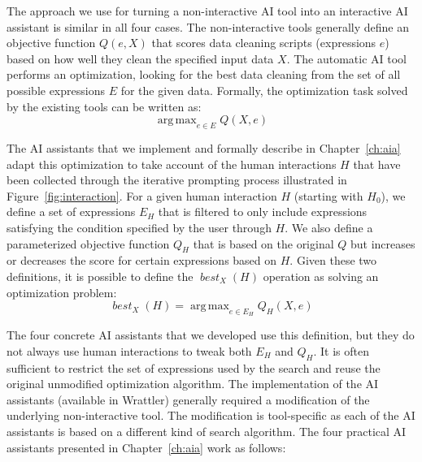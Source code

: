 \documentclass[fleqn,11pt]{report}
\newcommand{\Din}{X}
\DeclareMathOperator{\best}{\mathit{best}}
\DeclareMathOperator{\argmax}{\mathrm{arg\,max}}
\theoremstyle{definition}
\begin{document}
The approach we use for turning a non-interactive AI tool into an interactive AI assistant
is similar in all four cases. The non-interactive tools generally define an objective function
$Q(e,\Din)$ that scores data cleaning scripts (expressions $e$) based on how well they clean the
specified input data $\Din$. The automatic AI tool performs an optimization, looking for the
best data cleaning from the set of all possible expressions $E$ for the given data. Formally,
the optimization task solved by the existing tools can be written as:
%
\vspace{-0.25em}
\begin{equation*}
\argmax_{e \in E} Q(\Din, e)
\end{equation*}
\vspace{-1.25em}

\noindent
The AI assistants that we implement and formally describe in Chapter~\ref{ch:aia} adapt this
optimization to take account of the human interactions $H$ that have been collected through
the iterative prompting process illustrated in Figure~\ref{fig:interaction}. For a given
human interaction $H$ (starting with $H_0$), we define a set of expressions $E_H$ that is
filtered to only include expressions satisfying the condition specified by the user through
$H$. We also define a parameterized objective function $Q_H$ that is based on the original
$Q$ but increases or decreases the score for certain expressions based on $H$. Given these
two definitions, it is possible to define the $\best_\Din(H)$ operation as solving an
optimization problem:
%
\vspace{-0.25em}
\begin{equation*}
\best_\Din(H) = \argmax_{e \in E_H} Q_H(\Din, e)
\end{equation*}
\vspace{-1.25em}

\noindent
The four concrete AI assistants that we developed use this definition, but they do not
always use human interactions to tweak both $E_H$ and $Q_H$. It is often sufficient to
restrict the set of expressions used by the search and reuse the original unmodified optimization
algorithm. The implementation of the AI assistants (available in Wrattler) generally required
a modification of the underlying non-interactive tool. The modification is tool-specific as
each of the AI assistants is based on a different kind of search algorithm.
%
The four practical AI assistants presented in Chapter~\ref{ch:aia} work as follows:
\end{document}
